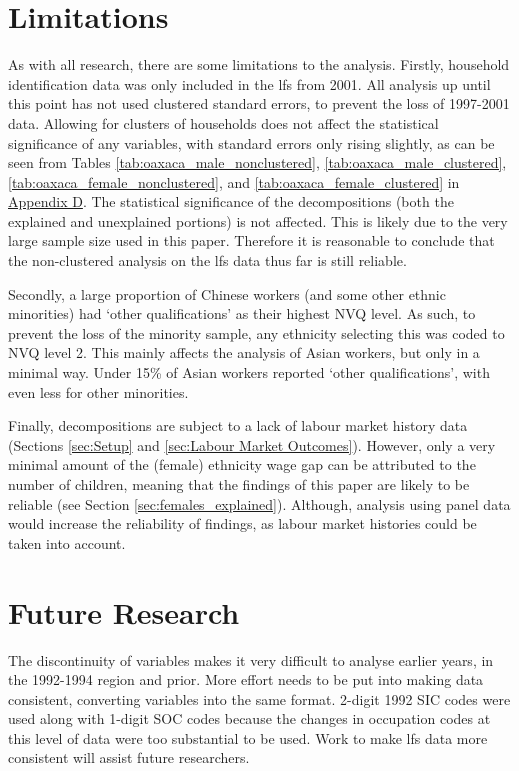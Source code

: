 \documentclass[class=article, crop=false]{standalone}
\begin{document}
\vspace{-25pt}
\section{Limitations}
\label{sec:limitations}
As with all research, there are some limitations to the analysis. Firstly, household identification data was only included in the \acrlong{lfs} from 2001. All analysis up until this point has not used clustered standard errors, to prevent the loss of 1997-2001 data. Allowing for clusters of households does not affect the statistical significance of any variables, with standard errors only rising slightly, as can be seen from Tables \ref{tab:oaxaca_male_nonclustered}, \ref{tab:oaxaca_male_clustered},  \ref{tab:oaxaca_female_nonclustered}, and \ref{tab:oaxaca_female_clustered} in \hyperref[sec:appendixD]{Appendix D}. The statistical significance of the decompositions (both the explained and unexplained portions) is not affected. This is likely due to the very large sample size used in this paper. Therefore it is reasonable to conclude that the non-clustered analysis on the \acrshort{lfs} data thus far is still reliable.

Secondly, a large proportion of Chinese workers (and some other ethnic minorities) had \enquote*{other qualifications} as their highest NVQ level. As such, to prevent the loss of the minority sample, any ethnicity selecting this was coded to NVQ level 2. This mainly affects the analysis of Asian workers, but only in a minimal way. Under 15\% of Asian workers reported \enquote*{other qualifications}, with even less for other minorities.

Finally, decompositions are subject to a lack of labour market history data (Sections \ref{sec:Setup} and \ref{sec:Labour Market Outcomes}). However, only a very minimal amount of the (female) ethnicity wage gap can be attributed to the number of children, meaning that the findings of this paper are likely to be reliable (see Section \ref{sec:females_explained}). Although, analysis using panel data would increase the reliability of findings, as labour market histories could be taken into account.

\section{Future Research}
\label{sec:Future Research}
The discontinuity of variables makes it very difficult to analyse earlier years, in the 1992-1994 region and prior. More effort needs to be put into making data consistent, converting variables into the same format. 2-digit 1992 SIC codes were used along with 1-digit SOC codes because the changes in occupation codes at this level of data were too substantial to be used. Work to make \acrshort{lfs} data more consistent will assist future researchers.
\end{document}
